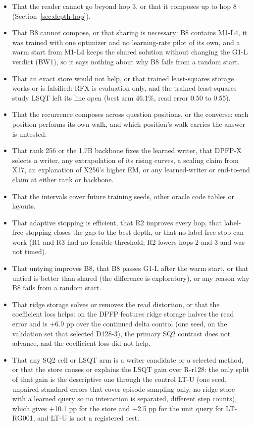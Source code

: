\begin{itemize}[leftmargin=1.4em,itemsep=2pt,topsep=3pt]
\item That the reader cannot go beyond hop 3, or that it composes up to hop 8 (Section~\ref{sec:depth-hop}).  %
\item That B8 cannot compose, or that sharing is necessary: B8 contains M1-L4, it was trained with one optimizer and no learning-rate pilot of its own, and a warm start from M1-L4 keeps the shared solution without changing the G1-L verdict (BW1), so it says nothing about why B8 fails from a random start.  %
\item That an exact store would not help, or that trained least-squares storage works or is falsified: RFX is evaluation only, and the trained least-squares study LSQT left its line open (best arm 46.1\%, read error 0.50 to 0.55).  %
\item That the recurrence composes across question positions, or the converse: each position performs its own walk, and which position's walk carries the answer is untested.  %
\item That rank 256 or the 1.7B backbone fixes the learned writer, that DPFP-X selects a writer, any extrapolation of its rising curves, a scaling claim from X17, an explanation of X256's higher EM, or any learned-writer or end-to-end claim at either rank or backbone.  %
\item That the intervals cover future training seeds, other oracle code tables or layouts.  %
\item That adaptive stopping is efficient, that R2 improves every hop, that label-free stopping closes the gap to the best depth, or that no label-free stop can work (R1 and R3 had no feasible threshold; R2 lowers hops 2 and 3 and was not timed).  %
\item That untying improves B8, that B8 passes G1-L after the warm start, or that untied is better than shared (the difference is exploratory), or any reason why B8 fails from a random start.  %
\item That ridge storage solves or removes the read distortion, or that the coefficient loss helps: on the DPFP features ridge storage halves the read error and is +6.9 pp over the continued delta control (one seed, on the validation set that selected D128-3), the primary SQ2 contrast does not advance, and the coefficient loss did not help.  %
\item That any SQ2 cell or LSQT arm is a writer candidate or a selected method, or that the store causes or explains the LSQT gain over R-r128: the only split of that gain is the descriptive one through the control LT-U (one seed, unpaired standard errors that cover episode sampling only, no ridge store with a learned query so no interaction is separated, different step counts), which gives +10.1 pp for the store and +2.5 pp for the unit query for LT-RG001, and LT-U is not a registered test.  %

\end{itemize}
